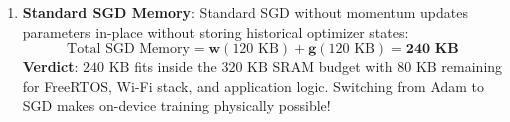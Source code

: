 \begin{enumerate}
\begin{enumerate}[label=(\alph*)]
        \item \textbf{Standard SGD Memory}:
        Standard SGD without momentum updates parameters in-place without storing historical optimizer states:
        \begin{equation*}
        \text{Total SGD Memory} = \mathbf{w} (120\text{ KB}) + \mathbf{g} (120\text{ KB}) = \mathbf{240\text{ KB}}
        \end{equation*}
        \textbf{Verdict}: $240\text{ KB}$ fits inside the $320\text{ KB}$ SRAM budget with $80\text{ KB}$ remaining for FreeRTOS, Wi-Fi stack, and application logic. Switching from Adam to SGD makes on-device training physically possible!
    \end{enumerate}
\end{enumerate}

